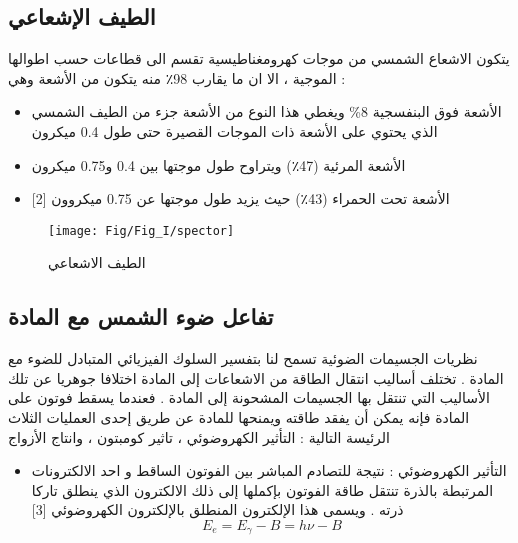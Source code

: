 \subsection{الطيف الإشعاعي}
يتكون الاشعاع الشمسي من موجات كهرومغناطيسية تقسم الى قطاعات حسب اطوالها الموجية ، الا ان ما يقارب 98٪ منه يتكون من الأشعة وهي :
\begin{itemize} 
	\item  الأشعة فوق البنفسجية 8\% ويغطي هذا النوع من الأشعة جزء من الطيف الشمسي الذي يحتوي على الأشعة ذات الموجات القصيرة حتى طول 0.4 ميكرون 
	\item الأشعة المرئية (47٪) ويتراوح طول موجتها بين 0.4 و0.75 ميكرون 
	\item الأشعة تحت الحمراء (43٪) حيث يزيد طول موجتها عن 0.75         ميكروون [2]
\end{itemize}
\begin{figure}[h!]
	\centering
	\texttt{[image: Fig/Fig\_I/spector]}
	\caption{الطيف الاشعاعي}
	\label{fig:spector}
\end{figure}

\subsection{ تفاعل ضوء الشمس مع المادة }
نظريات الجسيمات الضوئية تسمح لنا بتفسير السلوك الفيزيائي المتبادل للضوء مع المادة .
تختلف أساليب انتقال الطاقة من الاشعاعات إلى المادة اختلافا جوهريا عن تلك الأساليب التي تنتقل بها الجسيمات المشحونة إلى المادة . فعندما يسقط فوتون على المادة فإنه يمكن أن يفقد طاقته ويمنحها للمادة عن طريق إحدى العمليات الثلاث الرئيسة التالية : التأثير الكهروضوئي ، تاثير كومبتون ، وانتاج الأزواج 
\begin{itemize} 
	\item التأثير الكهروضوئي : نتيجة للتصادم المباشر بين الفوتون الساقط و احد الالكترونات المرتبطة بالذرة تنتقل طاقة الفوتون بإكملها إلى ذلك الالكترون الذي ينطلق تاركا ذرته . ويسمى هذا الإلكترون المنطلق بالإلكترون الكهروضوئي
	[3] 
	\begin {equation} 
	E_{e} = E_{\gamma} - B = h\nu -B
	\end {equation}
	\end {itemize}
